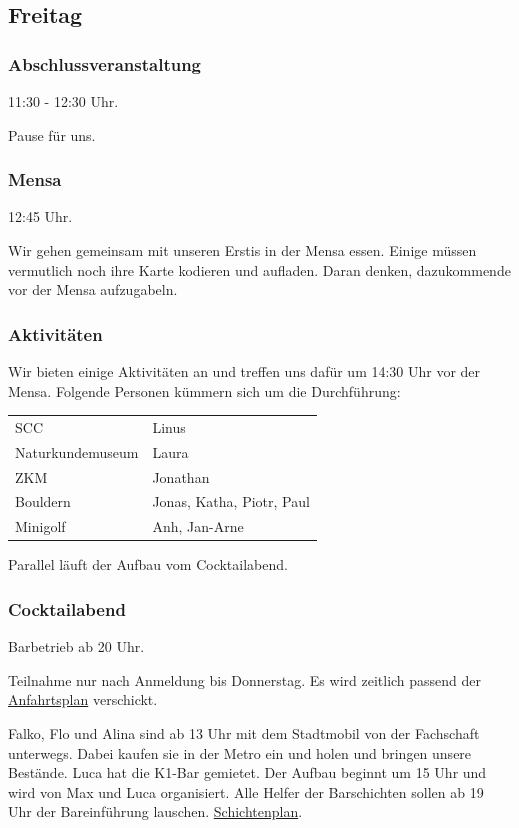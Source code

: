 \documentclass[10pt,ngerman]{scrartcl}
\begin{document}
\begin{multicols}{2}
\subsection{Freitag}

\subsubsection{Abschlussveranstaltung}

11:30 - 12:30 Uhr.

Pause für uns.

\subsubsection{Mensa}

12:45 Uhr.

Wir gehen gemeinsam mit unseren Erstis in der Mensa essen.
Einige müssen vermutlich noch ihre Karte kodieren und aufladen.
Daran denken, dazukommende vor der Mensa aufzugabeln.

\subsubsection{Aktivitäten}

Wir bieten einige Aktivitäten an und treffen uns dafür um 14:30 Uhr vor der Mensa.
Folgende Personen kümmern sich um die Durchführung:

\begin{tabular}[H]{ll}
    SCC & Linus \\
    Naturkundemuseum & Laura \\
    ZKM & Jonathan \\
    Bouldern & Jonas, Katha, Piotr, Paul \\
    Minigolf & Anh, Jan-Arne \\
\end{tabular}

Parallel läuft der Aufbau vom Cocktailabend.

\subsubsection{Cocktailabend}

Barbetrieb ab 20 Uhr.

Teilnahme nur nach Anmeldung bis Donnerstag.
Es wird zeitlich passend der \href{https://discord.com/channels/739522765677133894/963505261388107846/1030438323086438440}{Anfahrtsplan} verschickt.

Falko, Flo und Alina sind ab 13 Uhr mit dem Stadtmobil von der Fachschaft unterwegs.
Dabei kaufen sie in der Metro ein und holen und bringen unsere Bestände.
Luca hat die K1-Bar gemietet.
Der Aufbau beginnt um 15 Uhr und wird von Max und Luca organisiert.
Alle Helfer der Barschichten sollen ab 19 Uhr der Bareinführung lauschen.
\href{https://docs.google.com/spreadsheets/d/17ycbRMmSfck2oAsiZ9djPUULAgf4-vCJ6Q4EXgZmB0g/edit?usp=sharing}{Schichtenplan}.




\end{multicols}
\end{document}
